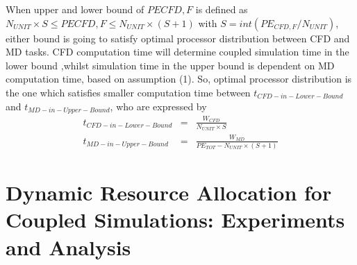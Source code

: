 \documentclass[conference,final]{IEEEtran}
\begin{document}
{\footnotesize{When upper and lower bound of $PE{CFD,F}$ is defined as
$ N_{UNIT} \times S \le PE{CFD,F} \le N_{UNIT} \times (S+1) $
with $S = int(PE_{CFD,F} / N_{UNIT})$, either bound is going to
satisfy optimal processor distribution between CFD and MD tasks. CFD
computation time will determine coupled simulation time in the lower
bound ,whilst simulation time in the upper bound is dependent on MD
computation time, based on assumption (1). So, optimal processor
distribution is the one which satisfies smaller computation time
between $t_{CFD-in-Lower-Bound}$ and $t_{MD-in-Upper-Bound}$, who are
expressed by
\begin{eqnarray}
t_{CFD-in-Lower-Bound} & = & \frac {W_{CFD}} {N_{UNIT} \times S}
\nonumber \\
t_{MD-in-Upper-Bound} & = & \frac {W_{MD}} {PE_{TOT}-N_{UNIT} \times (S+1)}
\label{eq:Optimal_Time_Condition}
\end{eqnarray}
}}











\section{Dynamic Resource Allocation for Coupled Simulations:
  Experiments and Analysis}
\end{document}
